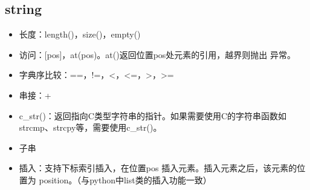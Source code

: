\documentclass[letterpaper,10pt,english]{sphinxmanual}
\begin{document}
\subsection{string}
\label{\detokenize{cpp/19_stl:string}}
%
\begin{sphinxVerbatim}[commandchars=\\\{\}]
\end{sphinxVerbatim}
\begin{itemize}
\item {} 
长度：length()，size()，empty()

\item {} 
访问：{[}pos{]}，at(pos)。at()返回位置pos处元素的引用，越界则抛出  异常。

\item {} 
字典序比较：==，!=，\textless{}，\textless{}=，\textgreater{}，\textgreater{}=

\item {} 
串接：+

\item {} 
c\_str()：返回指向C类型字符串的指针。如果需要使用C的字符串函数如strcmp、strcpy等，需要使用c\_str()。

%
\begin{sphinxVerbatim}[commandchars=\\\{\}]
    
\end{sphinxVerbatim}

\item {} 
子串

%
\begin{sphinxVerbatim}[commandchars=\\\{\}]
         
\end{sphinxVerbatim}

\item {} 
插入：支持下标索引插入，在位置pos  插入元素。插入元素之后，该元素的位置为 position。（与python中list类的插入功能一致）


\end{itemize}
\end{document}
